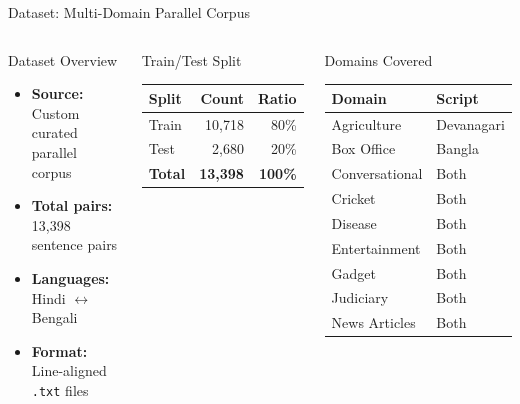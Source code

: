 \documentclass[aspectratio=169]{beamer}
\begin{document}
\begin{frame}{Dataset: Multi-Domain Parallel Corpus}
\begin{columns}[T]
    \begin{block}{Dataset Overview}
      \begin{itemize}
        \item \textbf{Source:} Custom curated parallel corpus
        \item \textbf{Total pairs:} 13,398 sentence pairs
        \item \textbf{Languages:} Hindi $\leftrightarrow$ Bengali
        \item \textbf{Format:} Line-aligned \texttt{.txt} files
      \end{itemize}
    \end{block}
    \vspace{0.5em}
    \begin{alertblock}{Train/Test Split}
      \centering
      \begin{tabular}{lrr}
        \toprule
        \textbf{Split} & \textbf{Count} & \textbf{Ratio} \\
        \midrule
        Train & 10,718 & 80\% \\
        Test  & 2,680  & 20\% \\
        \midrule
        \textbf{Total} & \textbf{13,398} & \textbf{100\%} \\
        \bottomrule
      \end{tabular}
    \end{alertblock}

    \begin{block}{Domains Covered}
      \begin{tabular}{ll}
        \toprule
        \textbf{Domain} & \textbf{Script} \\
        \midrule
        Agriculture & Devanagari \\
        Box Office  & Bangla \\
        Conversational & Both \\
        Cricket & Both \\
        Disease & Both \\
        Entertainment & Both \\
        Gadget & Both \\
        Judiciary & Both \\
        News Articles & Both \\
        \bottomrule
      \end{tabular}
    \end{block}
\end{columns}
\end{frame}
\end{document}
